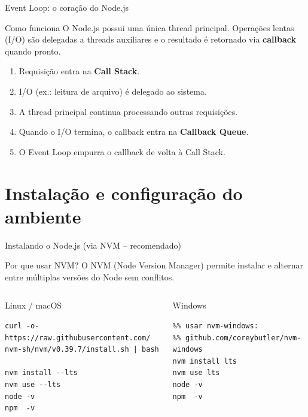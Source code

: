 \documentclass[aspectratio=169]{beamer}
\begin{document}
\begin{frame}{Event Loop: o cora\c{c}\~ao do Node.js}
\begin{block}{Como funciona}
O Node.js possui uma \'{u}nica thread principal. Opera\c{c}\~oes lentas (I/O) s\~ao delegadas a threads auxiliares e o resultado \'{e} retornado via \textbf{callback} quando pronto.
\end{block}
\begin{enumerate}
  \item Requisi\c{c}\~ao entra na \textbf{Call Stack}.
  \item I/O (ex.: leitura de arquivo) \'{e} delegado ao sistema.
  \item A thread principal continua processando outras requisi\c{c}\~oes.
  \item Quando o I/O termina, o callback entra na \textbf{Callback Queue}.
  \item O Event Loop empurra o callback de volta \`a Call Stack.
\end{enumerate}
\end{frame}

\section{Instala\c{c}\~ao e configura\c{c}\~ao do ambiente}

\begin{frame}[fragile]{Instalando o Node.js (via NVM -- recomendado)}
\begin{block}{Por que usar NVM?}
O NVM (Node Version Manager) permite instalar e alternar entre m\'ultiplas vers\~oes do Node sem conflitos.
\end{block}
\begin{columns}[T]
\begin{block}{Linux / macOS}
\begin{lstlisting}
curl -o- https://raw.githubusercontent.com/
nvm-sh/nvm/v0.39.7/install.sh | bash

nvm install --lts
nvm use --lts
node -v
npm  -v
\end{lstlisting}
\end{block}
\begin{block}{Windows}
\begin{lstlisting}
%% usar nvm-windows:
%% github.com/coreybutler/nvm-windows
nvm install lts
nvm use lts
node -v
npm  -v
\end{lstlisting}
\end{block}
\end{columns}
\end{frame}
\end{document}
